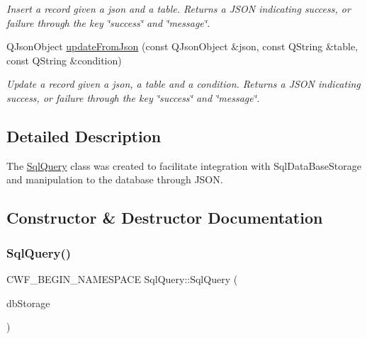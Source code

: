 \begin{DoxyCompactItemize}
\begin{DoxyCompactList}\small\item\em Insert a record given a json and a table. Returns a J\+S\+ON indicating success, or failure through the key \char`\"{}success\char`\"{} and \char`\"{}message\char`\"{}. \end{DoxyCompactList}\item 
Q\+Json\+Object \hyperlink{class_sql_query_a57821078a46629590e01e3645af13edf}{update\+From\+Json} (const Q\+Json\+Object \&json, const Q\+String \&table, const Q\+String \&condition)
\begin{DoxyCompactList}\small\item\em Update a record given a json, a table and a condition. Returns a J\+S\+ON indicating success, or failure through the key \char`\"{}success\char`\"{} and \char`\"{}message\char`\"{}. \end{DoxyCompactList}\end{DoxyCompactItemize}


\subsection{Detailed Description}
The \hyperlink{class_sql_query}{Sql\+Query} class was created to facilitate integration with Sql\+Data\+Base\+Storage and manipulation to the database through J\+S\+ON. 

\subsection{Constructor \& Destructor Documentation}
\mbox{\label{class_sql_query_a81ec51c1f78134ed0d5016774335460c}} 
\subsubsection{\texorpdfstring{Sql\+Query()}{SqlQuery()}}
{\footnotesize\ttfamily C\+W\+F\+\_\+\+B\+E\+G\+I\+N\+\_\+\+N\+A\+M\+E\+S\+P\+A\+CE Sql\+Query\+::\+Sql\+Query (\begin{DoxyParamCaption}\item[{\hyperlink{class_sql_database_storage}{Sql\+Database\+Storage} \&}]{db\+Storage }\end{DoxyParamCaption})\hspace{0.3cm}{\ttfamily [explicit]}}



